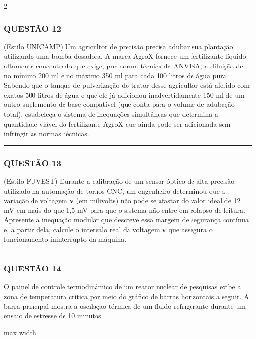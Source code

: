 \documentclass[11pt, a4paper]{article}
\begin{document}
\begin{multicols*}{2}
\subsubsection*{QUESTÃO 12}
(Estilo UNICAMP) Um agricultor de precisão precisa adubar sua plantação utilizando uma bomba dosadora. A marca AgroX fornece um fertilizante líquido altamente concentrado que exige, por norma técnica da ANVISA, a diluição de no mínimo 200 ml e no máximo 350 ml para cada 100 litros de água pura. Sabendo que o tanque de pulverização do trator desse agricultor está aferido com exatos 500 litros de água e que ele já adicionou inadvertidamente 150 ml de um outro suplemento de base compatível (que conta para o volume de adubação total), estabeleça o sistema de inequações simultâneas que determina a quantidade viável do fertilizante AgroX que ainda pode ser adicionada sem infringir as normas técnicas.
\vspace{0cm} \noindent\textcolor{CorLinha}{\rule{\linewidth}{0.5pt}} \vspace{-0.2cm}
\subsubsection*{QUESTÃO 13}
(Estilo FUVEST) Durante a calibração de um sensor óptico de alta precisão utilizado na automação de tornos CNC, um engenheiro determinou que a variação de voltagem \textbf{v} (em milivolts) não pode se afastar do valor ideal de 12 mV em mais do que 1,5 mV para que o sistema não entre em colapso de leitura. Apresente a inequação modular que descreve essa margem de segurança contínua e, a partir dela, calcule o intervalo real da voltagem \textbf{v} que assegura o funcionamento ininterrupto da máquina.
\vspace{0cm} \noindent\textcolor{CorLinha}{\rule{\linewidth}{0.5pt}} \vspace{-0.2cm}
\subsubsection*{QUESTÃO 14}
O painel de controle termodinâmico de um reator nuclear de pesquisas exibe a zona de temperatura crítica por meio do gráfico de barras horizontais a seguir. A barra principal mostra a oscilação térmica de um fluido refrigerante durante um ensaio de estresse de 10 minutos.

\begin{center}
\begin{adjustbox}{max width=\linewidth}
\end{adjustbox}
\end{center}
\end{multicols*}
\end{document}
